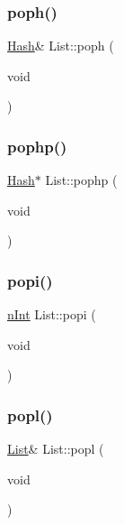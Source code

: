 \mbox{\label{classList_af54abe366bf8bc1a9a2c445412865917}} 
\subsubsection{\texorpdfstring{poph()}{poph()}}
{\footnotesize\ttfamily \mbox{\hyperlink{classHash}{Hash}}\& List\+::poph (\begin{DoxyParamCaption}\item[{void}]{ }\end{DoxyParamCaption})}

\mbox{\label{classList_a1a64b69b57b8ba008968c3392027d0ee}} 
\subsubsection{\texorpdfstring{pophp()}{pophp()}}
{\footnotesize\ttfamily \mbox{\hyperlink{classHash}{Hash}}$\ast$ List\+::pophp (\begin{DoxyParamCaption}\item[{void}]{ }\end{DoxyParamCaption})}

\mbox{\label{classList_a32abf5be3b243fbe932da566736271c3}} 
\subsubsection{\texorpdfstring{popi()}{popi()}}
{\footnotesize\ttfamily \mbox{\hyperlink{Node_8h_a17693eab3c96e5b590641f884a5a6ff1}{n\+Int}} List\+::popi (\begin{DoxyParamCaption}\item[{void}]{ }\end{DoxyParamCaption})}

\mbox{\label{classList_af85f08bba92c89fcd5e03efb69f5843c}} 
\subsubsection{\texorpdfstring{popl()}{popl()}}
{\footnotesize\ttfamily \mbox{\hyperlink{classList}{List}}\& List\+::popl (\begin{DoxyParamCaption}\item[{void}]{ }\end{DoxyParamCaption})}

